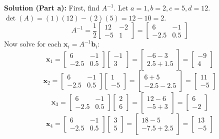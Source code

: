 \documentclass[11pt]{article}
\begin{document}
\textbf{Solution (Part a):}
First, find $A^{-1}$. Let $a=1, b=2, c=5, d=12$.
$\det(A) = (1)(12) - (2)(5) = 12 - 10 = 2$.
\[ A^{-1} = \frac{1}{2} \begin{bmatrix} 12 & -2 \\ -5 & 1 \end{bmatrix} = \begin{bmatrix} 6 & -1 \\ -2.5 & 0.5 \end{bmatrix} \]
Now solve for each $\mathbf{x}_i = A^{-1} \mathbf{b}_i$:
\[ \mathbf{x}_1 = \begin{bmatrix} 6 & -1 \\ -2.5 & 0.5 \end{bmatrix} \begin{bmatrix} -1 \\ 3 \end{bmatrix} = \begin{bmatrix} -6 - 3 \\ 2.5 + 1.5 \end{bmatrix} = \begin{bmatrix} -9 \\ 4 \end{bmatrix} \]
\[ \mathbf{x}_2 = \begin{bmatrix} 6 & -1 \\ -2.5 & 0.5 \end{bmatrix} \begin{bmatrix} 1 \\ -5 \end{bmatrix} = \begin{bmatrix} 6 + 5 \\ -2.5 - 2.5 \end{bmatrix} = \begin{bmatrix} 11 \\ -5 \end{bmatrix} \]
\[ \mathbf{x}_3 = \begin{bmatrix} 6 & -1 \\ -2.5 & 0.5 \end{bmatrix} \begin{bmatrix} 2 \\ 6 \end{bmatrix} = \begin{bmatrix} 12 - 6 \\ -5 + 3 \end{bmatrix} = \begin{bmatrix} 6 \\ -2 \end{bmatrix} \]
\[ \mathbf{x}_4 = \begin{bmatrix} 6 & -1 \\ -2.5 & 0.5 \end{bmatrix} \begin{bmatrix} 3 \\ 5 \end{bmatrix} = \begin{bmatrix} 18 - 5 \\ -7.5 + 2.5 \end{bmatrix} = \begin{bmatrix} 13 \\ -5 \end{bmatrix} \]
\end{document}
